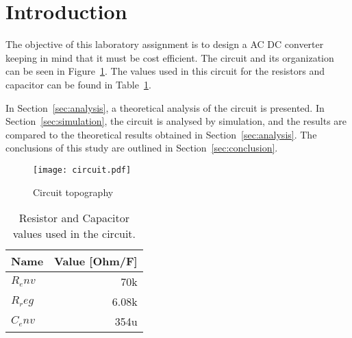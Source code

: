 \section{Introduction}
\label{sec:introduction}

\tab The objective of this laboratory assignment is to design a AC DC converter keeping in mind that it must be cost efficient.
The circuit and its organization can be seen in Figure~\ref{fig:circuit}.
The values used in this circuit for the resistors and capacitor can be found in Table~\ref{tab:values}.

In Section~\ref{sec:analysis}, a theoretical analysis of the circuit is
presented. In Section~\ref{sec:simulation}, the circuit is analysed by
simulation, and the results are compared to the theoretical results obtained in
Section~\ref{sec:analysis}. The conclusions of this study are outlined in
Section~\ref{sec:conclusion}.
\\[1cm]
\begin{figure}[h] \centering
\texttt{[image: circuit.pdf]}
\caption{Circuit topography}
\label{fig:circuit}
\end{figure}

\begin{table}[H]
  \centering
  \begin{tabular}{|l|r|}
    \hline    
    {\bf Name} & {\bf Value [Ohm/F]} \\ \hline
    $R_env$ & 70k \\ \hline
    $R_reg$ & 6.08k \\ \hline
    $C_env$ & 354u \\ \hline	
  \end{tabular}
  \caption{Resistor and Capacitor values used in the circuit.}
  \label{tab:values}
\end{table}
